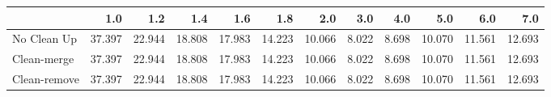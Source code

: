 \begin{tabular}{lrrrrrrrrrrr}
\toprule
{} &    1.0 &    1.2 &    1.4 &    1.6 &    1.8 &    2.0 &   3.0 &   4.0 &    5.0 &    6.0 &    7.0 \\
\midrule
No Clean Up  & 37.397 & 22.944 & 18.808 & 17.983 & 14.223 & 10.066 & 8.022 & 8.698 & 10.070 & 11.561 & 12.693 \\
Clean-merge  & 37.397 & 22.944 & 18.808 & 17.983 & 14.223 & 10.066 & 8.022 & 8.698 & 10.070 & 11.561 & 12.693 \\
Clean-remove & 37.397 & 22.944 & 18.808 & 17.983 & 14.223 & 10.066 & 8.022 & 8.698 & 10.070 & 11.561 & 12.693 \\
\bottomrule
\end{tabular}
